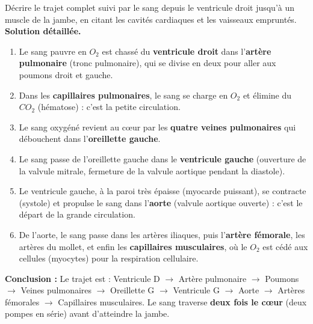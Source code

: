 \documentclass[11pt]{article}
\begin{document}
\begin{exoresolu}
Décrire le trajet complet suivi par le sang depuis le ventricule droit jusqu'à un muscle de la jambe, en citant les cavités cardiaques et les vaisseaux empruntés.
\tcblower
\textbf{Solution détaillée.}
\begin{enumerate}
\item Le sang pauvre en $O_2$ est chassé du \textbf{ventricule droit} dans l'\textbf{artère pulmonaire} (tronc pulmonaire), qui se divise en deux pour aller aux poumons droit et gauche.
\item Dans les \textbf{capillaires pulmonaires}, le sang se charge en $O_2$ et élimine du $CO_2$ (hématose) : c'est la petite circulation.
\item Le sang oxygéné revient au cœur par les \textbf{quatre veines pulmonaires} qui débouchent dans l'\textbf{oreillette gauche}.
\item Le sang passe de l'oreillette gauche dans le \textbf{ventricule gauche} (ouverture de la valvule mitrale, fermeture de la valvule aortique pendant la diastole).
\item Le ventricule gauche, à la paroi très épaisse (myocarde puissant), se contracte (systole) et propulse le sang dans l'\textbf{aorte} (valvule aortique ouverte) : c'est le départ de la grande circulation.
\item De l'aorte, le sang passe dans les artères iliaques, puis l'\textbf{artère fémorale}, les artères du mollet, et enfin les \textbf{capillaires musculaires}, où le $O_2$ est cédé aux cellules (myocytes) pour la respiration cellulaire.
\end{enumerate}
\textbf{Conclusion :} Le trajet est : Ventricule D $\rightarrow$ Artère pulmonaire $\rightarrow$ Poumons $\rightarrow$ Veines pulmonaires $\rightarrow$ Oreillette G $\rightarrow$ Ventricule G $\rightarrow$ Aorte $\rightarrow$ Artères fémorales $\rightarrow$ Capillaires musculaires. Le sang traverse \textbf{deux fois le cœur} (deux pompes en série) avant d'atteindre la jambe.
\end{exoresolu}
\end{document}
